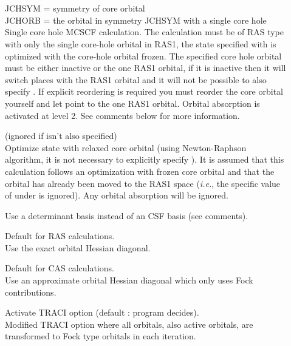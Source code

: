 \begin{description}
\item[] \ \\
   \\
  JCHSYM = symmetry of core orbital\\
  JCHORB = the orbital in symmetry JCHSYM with a single core hole\\
  Single core hole MCSCF calculation. The calculation must be of RAS type
  with only the single core-hole orbital in RAS1, the state specified with
   is optimized with the core-hole orbital
  frozen.
  The specified core hole orbital must be either inactive or
  the one RAS1 orbital, if it is inactive then it will switch places with
  the RAS1 orbital and it will not be possible to also
  specify . If explicit reordering is required you must reorder
  the core orbital yourself and let  point to the one RAS1 orbital.
  Orbital absorption is activated at level 2. See comments below for more information.

\item[]
  (ignored if  isn't also specified)\\
  Optimize state with relaxed core orbital (using Newton-Raphson algorithm,
  it is not necessary to explicitly specify ).
  It is assumed that this calculation follows an optimization
  with frozen core orbital and that the orbital has already been
  moved to the RAS1 space ({\it i.e.\/}, the specific value of
   under  is ignored). Any
  orbital absorption   will be ignored.

\item[]
  Use a determinant basis instead of an CSF basis (see comments).

\item[]
  Default for RAS calculations.\\
  Use the exact orbital Hessian diagonal.

\item[]
  Default for CAS calculations.\\
  Use an approximate orbital Hessian diagonal which only uses Fock
  contributions.

\item[]
  Activate TRACI option (default : program decides).\\
  Modified TRACI option where all orbitals, also active orbitals, are
  transformed to Fock type orbitals in each iteration.


\end{description}
